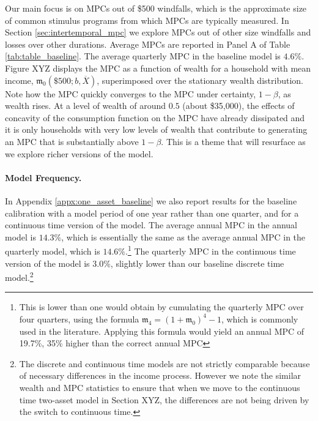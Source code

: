 %

Our main focus is on MPCs out of \$500 windfalls, which is the approximate size of common stimulus programs from which MPCs are typically measured. In Section \ref{sec:intertemporal_mpc} we explore MPCs out of other size windfalls and losses over other durations. Average MPCs are reported in Panel A of Table \ref{tab:table_baseline}. The average quarterly MPC in the baseline model is $4.6\%$. Figure XYZ displays the MPC as a function of wealth for a household with mean income, $\mathfrak{m}_{0}\left(\$500;b,\overline{X}\right)$, superimposed over the stationary wealth distribution. Note how the MPC quickly converges to the MPC under certainty, $1-\beta$, as wealth rises. At a level of wealth of around $0.5$ (about \$35,000), the effects of concavity of the consumption function on the MPC have already dissipated and it is only households with very low levels of wealth that contribute to generating an MPC that is substantially above $1-\beta$. This is a theme that will resurface as we explore richer versions of the model.


\paragraph{Model Frequency.}
In Appendix \ref{appx:one_asset_baseline} we also report results for the baseline calibration with a model period of one year rather than one quarter, and for a continuous time version of the model. The average annual MPC in the annual model is $14.3\%$, which is essentially the same as the average annual MPC in the quarterly model, which is $14.6\%$.\footnote{This is lower than one would obtain by cumulating the quarterly MPC over four quarters, using the formula $\mathfrak{m}_{4} = \left(1+\mathfrak{m}_{0}\right)^{4} -1$, which is commonly used in the literature. Applying this formula would yield an annual MPC of 19.7\%, 35\% higher than the correct annual MPC}
The quarterly MPC in the continuous time version of the model is 3.0\%, slightly lower than our baseline discrete time model.\footnote{The discrete and continuous time models are not strictly comparable because of necessary differences in the income process. However we note the similar wealth and MPC statistics to ensure that when we move to the continuous time two-asset model in Section XYZ, the differences are not being driven by the switch to continuous time.} 


